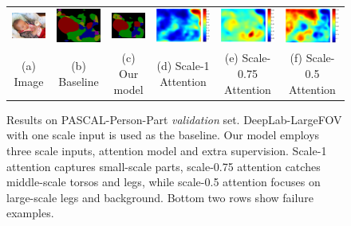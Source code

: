 \begin{figure}
\begin{tabular}{c c c c c c}
   \includegraphics[height=0.10\linewidth]{fig/voc10_part/img/2008_000522.jpg} &
   \includegraphics[height=0.10\linewidth]{fig/voc10_part/res_baseline/2008_000522.png} &
   \includegraphics[height=0.10\linewidth]{fig/voc10_part/res_sharenet/2008_000522.png} &
   \includegraphics[height=0.10\linewidth]{fig/voc10_part/att1/2008_000522.pdf} &
   \includegraphics[height=0.10\linewidth]{fig/voc10_part/att2/2008_000522.pdf} &
   \includegraphics[height=0.10\linewidth]{fig/voc10_part/att3/2008_000522.pdf} \\
   {\scriptsize (a) Image} & 
   {\scriptsize (b) Baseline} & 
   {\scriptsize (c) Our model} & 
   {\scriptsize (d) Scale-1 Attention} & 
   {\scriptsize (e) Scale-0.75 Attention} &
   {\scriptsize (f) Scale-0.5 Attention} \\
  \end{tabular}
  \vspace{1pt}
  \caption{Results on PASCAL-Person-Part {\it validation} set. DeepLab-LargeFOV with one scale input is used as the baseline. Our model employs three scale inputs, attention model and extra supervision. Scale-1 attention captures small-scale parts, scale-0.75 attention catches middle-scale torsos and legs, while scale-0.5 attention focuses on large-scale legs and background. Bottom two rows show failure examples.}
  \label{fig:pascal_part_results}  
\end{figure}

